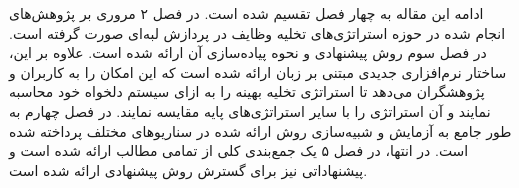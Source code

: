 ادامه این مقاله به چهار فصل تقسیم شده است. در فصل ۲ مروری بر پژوهش‌های انجام شده در حوزه استراتژی‌های تخلیه وظایف در پردازش لبه‌ای صورت گرفته است. در فصل سوم روش پیشنهادی و نحوه پیاده‌سازی آن ارائه شده است. علاوه بر این، ساختار نرم‌افزاری جدیدی مبتنی بر زبان  ارائه شده است که این امکان را به کاربران و پژوهشگران می‌دهد تا استراتژی تخلیه بهینه را به ازای سیستم دلخواه خود محاسبه نمایند و آن استراتژی را با سایر استراتژی‌های پایه مقایسه نمایند. در فصل چهارم به طور جامع به آزمایش و شبیه‌سازی روش ارائه شده در سناریوهای مختلف پرداخته شده است. در انتها، در فصل ۵ یک جمع‌بندی کلی از تمامی مطالب ارائه شده است و پیشنهاداتی نیز برای گسترش روش پیشنهادی ارائه شده است.


\clearpage

